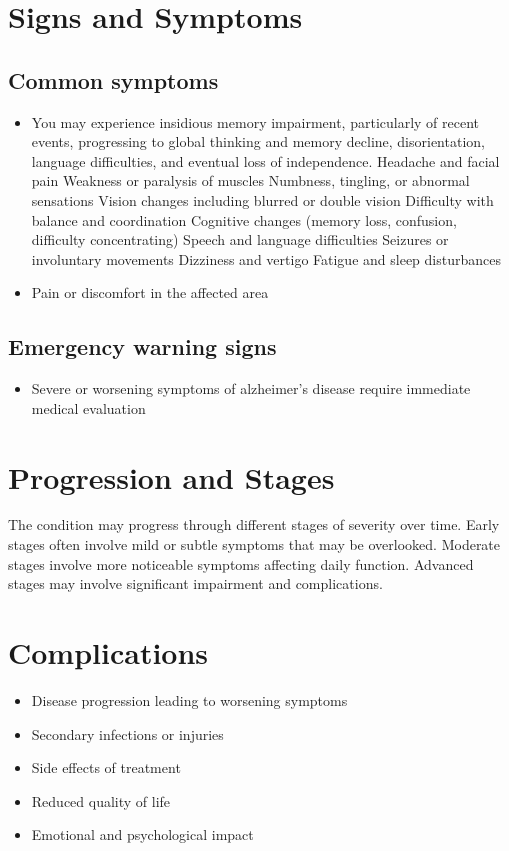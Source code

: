 \section{Signs and Symptoms}

\subsection{Common symptoms}
\begin{itemize}[noitemsep]
  \item You may experience insidious memory impairment, particularly of recent events, progressing to global thinking and memory decline, disorientation, language difficulties, and eventual loss of independence. Headache and facial pain Weakness or paralysis of muscles Numbness, tingling, or abnormal sensations Vision changes including blurred or double vision Difficulty with balance and coordination Cognitive changes (memory loss, confusion, difficulty concentrating) Speech and language difficulties Seizures or involuntary movements Dizziness and vertigo Fatigue and sleep disturbances

  \item Pain or discomfort in the affected area
  \end{itemize}

\subsection{Emergency warning signs}
\begin{itemize}[noitemsep]
  \item Severe or worsening symptoms of alzheimer's disease require immediate medical evaluation
\end{itemize}
\section{Progression and Stages}
The condition may progress through different stages of severity over time. Early stages often involve mild or subtle symptoms that may be overlooked. Moderate stages involve more noticeable symptoms affecting daily function. Advanced stages may involve significant impairment and complications.
\section{Complications}
\begin{itemize}[noitemsep]
  \item Disease progression leading to worsening symptoms
  \item Secondary infections or injuries
  \item Side effects of treatment
  \item Reduced quality of life
  \item Emotional and psychological impact
\end{itemize}
